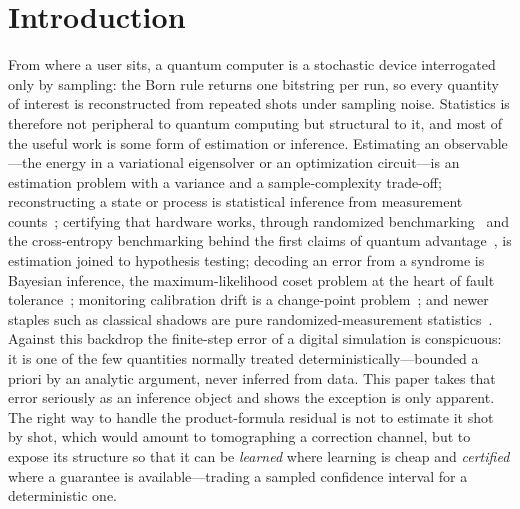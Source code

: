\documentclass[aps,prresearch,reprint,superscriptaddress,nofootinbib,amsmath,amssymb]{revtex4-2}
\begin{document}

\section{Introduction}

From where a user sits, a quantum computer is a stochastic device interrogated only by sampling: the Born rule returns one bitstring per run, so every quantity of interest is reconstructed from repeated shots under sampling noise. Statistics is therefore not peripheral to quantum computing but structural to it, and most of the useful work is some form of estimation or inference. Estimating an observable---the energy in a variational eigensolver or an optimization circuit---is an estimation problem with a variance and a sample-complexity trade-off; reconstructing a state or process is statistical inference from measurement counts~\cite{gross2010cs}; certifying that hardware works, through randomized benchmarking~\cite{magesan2011rb} and the cross-entropy benchmarking behind the first claims of quantum advantage~\cite{arute2019}, is estimation joined to hypothesis testing; decoding an error from a syndrome is Bayesian inference, the maximum-likelihood coset problem at the heart of fault tolerance~\cite{dennis2002}; monitoring calibration drift is a change-point problem~\cite{proctor2020drift}; and newer staples such as classical shadows are pure randomized-measurement statistics~\cite{huang2020shadows}. Against this backdrop the finite-step error of a digital simulation is conspicuous: it is one of the few quantities normally treated deterministically---bounded a priori by an analytic argument, never inferred from data. This paper takes that error seriously as an inference object and shows the exception is only apparent. The right way to handle the product-formula residual is not to estimate it shot by shot, which would amount to tomographing a correction channel, but to expose its structure so that it can be \emph{learned} where learning is cheap and \emph{certified} where a guarantee is available---trading a sampled confidence interval for a deterministic one.
\end{document}
